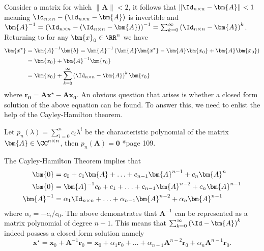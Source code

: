 Consider a matrix for which $\| \bm{A} \| < 2$, it follows that $\| \Id_{n \times n} - \bm{A} \| < 1$ meaning $\Id_{n \times n} - \left( \Id_{n \times n} - \bm{A} \right)$ is invertible and $\bm{A}^{-1} = \left( \Id_{n \times n} - \left( \Id_{n \times n} - \bm{A} \right) \right)^{-1} = \sum_{k=0}^{\infty} \left( \Id_{n \times n} - \bm{A} \right)^{k}$. Returning to  for any $\bm{x}_0 \in \RR^{n}$ we have
\begin{align*}
    \bm{x^{\star}} & = \bm{A}^{-1} \bm{b} = \bm{A}^{-1} \left( \bm{A} \bm{x^{\star}} - \bm{A} \bm{x_0} + \bm{A} \bm{x_0} \right) \\
                   & = \bm{x_0} + \bm{A}^{-1} \bm{r_0}                                                                           \\
                   & = \bm{x_0} + \sum_{k=0}^{\infty} \left( \Id_{n \times n} - \bm{A} \right)^k \bm{r_0}
\end{align*}
where $\bm{r_0} = \bm{A} \bm{x^{\star}} - \bm{A} \bm{x_0}$. An obvious question that arises is whether a closed form solution of the above equation can be found. To answer this, we need to enlist the help of the Cayley-Hamilton theorem.
\begin{thm} \label{theorem: cayley_amilton}
    Let $p_n \left( \lambda \right) = \sum_{i=0}^{n} c_i \lambda^{i}$ be the characteristic polynomial of the matrix $\bm{A} \in \CC^{n \times n}$, then $p_n \left( \bm{A} \right) = \bm{0}$ \cite{HornRogerA2013Ma/R}*{page 109}.
\end{thm}
The Cayley-Hamilton Theorem implies that
\begin{align*}
    \bm{0}      & = c_0 + c_1 \bm{A} + \ldots + c_{n-1} \bm{A}^{n-1} + c_{n} \bm{A}^{n}                      \\
    \bm{0}      & = \bm{A}^{-1} c_0 + c_1 + \ldots + c_{n-1} \bm{A}^{n-2} + c_{n} \bm{A}^{n-1}               \\
    \bm{A}^{-1} & = \alpha_1 \Id_{n \times n} + \ldots + \alpha_{n-1} \bm{A}^{n-2} + \alpha_{n} \bm{A}^{n-1}
\end{align*}
where $\alpha_i = -c_i / c_0$. The above demonstrates that $\bm{A}^{-1}$ can be represented as a matrix polynomial of degree $n-1$. This means that $\sum_{k=0}^{\infty} \left( \Id - \bm{A} \right)^k$ indeed possess a closed form solution namely
\begin{equation} \label{eq: x_ast_via_cayley}
    \bm{x^{\star}} = \bm{x}_0 + \bm{A}^{-1} \bm{r}_0 = \bm{x}_0 + \alpha_1 \bm{r}_0 + \ldots + \alpha_{n-1} \bm{A}^{n-2} \bm{r}_0 + \alpha_{n} \bm{A}^{n-1} \bm{r}_0.
\end{equation}
